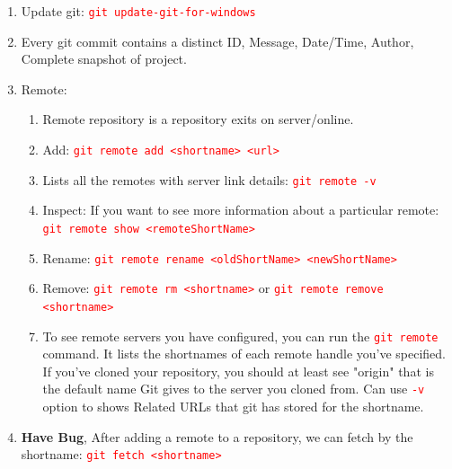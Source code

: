\documentclass[12 pt, letterpaper]{extarticle}
\newcommand{\R}{\textcolor{red}} %
\newcommand{\T}{\texttt}
\begin{document}
\begin{enumerate}
	\item Update git: \R{\T{git update-git-for-windows}}
	\item Every git commit contains a distinct ID, Message, Date/Time, Author, Complete snapshot of project.

	\item Remote:
		\begin{enumerate}
			\item Remote repository is a repository exits on server/online.
			\item Add: \R{\T{git remote add <shortname> <url>}}
			\item Lists all the remotes with server link details: \R{\T{git remote -v}}
			\item Inspect: If you want to see more information about a particular remote: \R{\T{git remote show <remoteShortName>}}
			\item Rename: \R{\T{git remote rename <oldShortName> <newShortName>}}
			\item Remove: \R{\T{git remote rm <shortname>}} or \R{\T{git remote remove <shortname>}}
			\item To see remote servers you have configured, you can run the \R{\T{git remote}} command. It lists the shortnames of each remote handle you've specified. If you've cloned your repository, you should at least see "origin" that is the default name Git gives to the server you cloned from. Can use \R{\T{-v}} option to shows Related URLs that git has stored for the shortname.
		\end{enumerate}	
	
	\item \textbf{Have Bug}, After adding a remote to a repository, we can fetch by the shortname: \R{\T{git fetch <shortname>}}
\end{enumerate}
\end{document}
